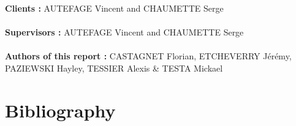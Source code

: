 \documentclass[12pt,a4paper]{report}
\begin{document}
\noindent
\begin{center}
\textbf{Clients :} AUTEFAGE Vincent and CHAUMETTE Serge\\~\\
\textbf{Supervisors :} AUTEFAGE Vincent and CHAUMETTE Serge\\~\\
\vspace{3cm}
\textbf{Authors of this report :} CASTAGNET Florian, ETCHEVERRY Jérémy, PAZIEWSKI Hayley, TESSIER Alexis \& TESTA Mickael\\
\end{center}

\newpage

\thispagestyle{empty}
\setcounter{page}{0}

\setcounter{page}{0}

\tableofcontents

\newpage

\listoffigures

\newpage


\newpage


\newpage



\newpage



\newpage



\newpage



\newpage



\newpage



\newpage



\newpage



\newpage



\newpage



\newpage

\part{Bibliography}

\nocite{*}


\end{document}
